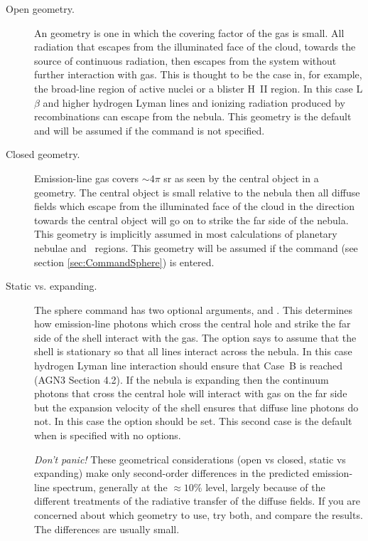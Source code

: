 \begin{description}
\item[Open geometry.]
An  geometry is one in which the covering factor
of the gas is small. All radiation that escapes from the illuminated face
of the cloud, towards the source of continuous radiation, then escapes from
the system without further interaction with gas. This is thought to be
the case in, for example, the broad-line region of active nuclei or a blister
H~II region.  In this case L$\beta$ and higher hydrogen Lyman lines and ionizing
radiation produced by recombinations can escape from the nebula.  This
geometry is the default and will be assumed if the  command is not specified.

\item[Closed geometry.]
Emission-line gas covers ${\sim}4\pi$ sr as seen by the central
object in a  geometry.
The central object is small relative to
the nebula then all diffuse fields which escape from the illuminated face
of the cloud in the direction towards the central object will go on to strike
the far side of the nebula.
This geometry is implicitly assumed in most
calculations of planetary nebulae and \hii\ regions.
This geometry will be
assumed if the  command (see section \ref{sec:CommandSphere}) is entered.

\item[Static vs. expanding.]
The sphere command has two optional arguments,
 and .  This determines how emission-line photons which cross
the central hole and strike the far side of the shell interact with the
gas.  The  option says to assume that the shell is stationary so that
all lines interact across the nebula.  In this case hydrogen Lyman line
interaction should ensure that Case~B is reached (AGN3 Section 4.2).  If
the nebula is expanding then the continuum photons that cross the central
hole will interact with gas on the far side but the expansion velocity of
the shell ensures that diffuse line photons do not.  In this case the
 option should be set.  This second case is the default
when 
is specified with no options.

\emph{Don't panic!}  These geometrical considerations (open vs closed, static
vs expanding) make only second-order differences in the predicted
emission-line spectrum, generally at the ${\approx}10$\% level, largely because of
the different treatments of the radiative transfer of the diffuse fields.
If you are concerned about which geometry to use, try both, and compare
the results.  The differences are usually small.
\end{description}

